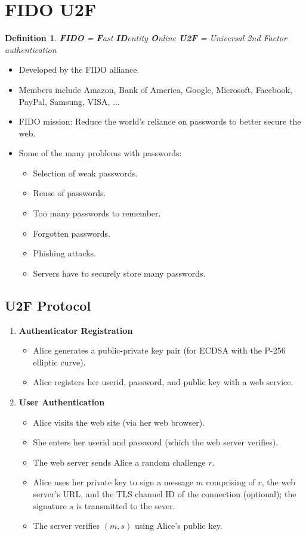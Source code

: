 \documentclass[12pt,titlepage]{article}
\newtheorem{protodefinition}[prototheorem]{Definition}
\newenvironment{definition}
{\colorlet{shadecolor}{cyan!15}\begin{shaded}\begin{protodefinition}\normalfont}{\end{protodefinition}\end{shaded}}
\let\stdsection\section
\renewcommand\section{\clearpage\stdsection}
\begin{document}
\section{FIDO U2F}
\begin{definition}
\textbf{FIDO} = \textbf{F}ast \textbf{ID}entity \textbf{O}nline
\textbf{U2F} = Universal 2nd Factor authentication
\end{definition}
\begin{itemize}
	\item Developed by the FIDO alliance.
	\item Members include Amazon, Bank of America, Google, Microsoft, Facebook, PayPal, Samsung, VISA, ...
	\item FIDO mission: Reduce the world’s reliance on passwords to better secure the web.
	\item Some of the many problems with passwords:\begin{itemize}
		\item Selection of weak passwords.
		\item Reuse of passwords.
		\item Too many passwords to remember.
		\item Forgotten passwords.
		\item Phishing attacks.
		\item Servers have to securely store many passwords.
	\end{itemize}
\end{itemize}
\subsection{U2F Protocol}
\begin{enumerate}
	\item \textbf{Authenticator Registration}\begin{itemize}
		\item Alice generates a public-private key pair (for ECDSA with the P-256 elliptic curve).
		\item Alice registers her userid, password, and public key with a web service.
	\end{itemize}
	\item \textbf{User Authentication}\begin{itemize}
		\item Alice visits the web site (via her web browser).
		\item She enters her userid and password (which the web server verifies).
		\item The web server sends Alice a random challenge $r$.
		\item Alice uses her private key to sign a message $m$ comprising of $r$, the web server’s URL, and the TLS channel ID of the connection (optional); the signature $s$ is transmitted to the sever.
		\item The server verifies $(m, s)$ using Alice’s public key.
	\end{itemize}
\end{enumerate}
\end{document}
